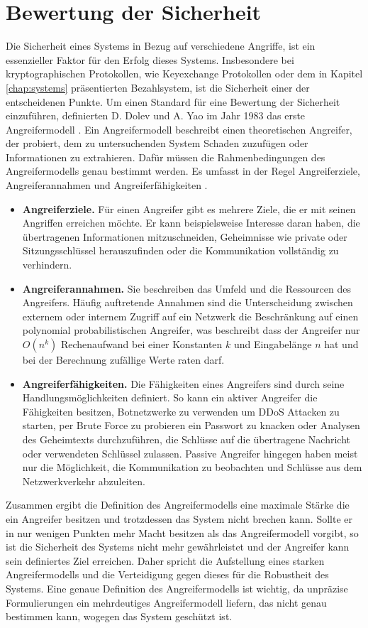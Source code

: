 \documentclass[
	fontsize=11pt,
	headings=small,
	parskip=half,           %
	bibliography=totoc,
	numbers=noenddot,       %
	open=any,               %
]{scrreprt}
\begin{document}
\section{Bewertung der Sicherheit}
\label{sec:auswertungSecurity}
Die Sicherheit eines Systems in Bezug auf verschiedene Angriffe, ist ein essenzieller Faktor für den Erfolg dieses Systems. Insbesondere bei kryptographischen Protokollen, wie Keyexchange Protokollen oder dem in Kapitel \ref{chap:systems} präsentierten Bezahlsystem, ist die Sicherheit einer der entscheidenen Punkte. Um einen Standard für eine Bewertung der Sicherheit einzuführen, definierten D. Dolev und A. Yao im Jahr 1983 das erste Angreifermodell \cite{am-dolev1983security}. Ein Angreifermodell beschreibt einen theoretischen Angreifer, der probiert, dem zu untersuchenden System Schaden zuzufügen oder Informationen zu extrahieren. Dafür müssen die Rahmenbedingungen des Angreifermodells genau bestimmt werden. Es umfasst in der Regel Angreiferziele, Angreiferannahmen und Angreiferfähigkeiten \cite{am-do2019role}. 
\begin{itemize}
    \item \textbf{Angreiferziele.} Für einen Angreifer gibt es mehrere Ziele, die er mit seinen Angriffen erreichen möchte. Er kann beispielsweise Interesse daran haben, die übertragenen Informationen mitzuschneiden, Geheimnisse wie private oder Sitzungsschlüssel herauszufinden oder die Kommunikation vollständig zu verhindern. 
    \item \textbf{Angreiferannahmen.} Sie beschreiben das Umfeld und die Ressourcen des Angreifers. Häufig auftretende Annahmen sind die Unterscheidung zwischen externem oder internem Zugriff auf ein Netzwerk die Beschränkung auf einen polynomial probabilistischen Angreifer, was beschreibt dass der Angreifer nur $O(n^k)$ Rechenaufwand bei einer Konstanten $k$ und Eingabelänge $n$ hat und bei der Berechnung zufällige Werte raten darf.
    \item \textbf{Angreiferfähigkeiten.} Die Fähigkeiten eines Angreifers sind durch seine Handlungsmöglichkeiten definiert. So kann ein aktiver Angreifer die Fähigkeiten besitzen, Botnetzwerke zu verwenden um DDoS Attacken zu starten, per Brute Force zu probieren ein Passwort zu knacken oder Analysen des Geheimtexts durchzuführen, die Schlüsse auf die übertragene Nachricht oder verwendeten Schlüssel zulassen. Passive Angreifer hingegen haben meist nur die Möglichkeit, die Kommunikation zu beobachten und Schlüsse aus dem Netzwerkverkehr abzuleiten.
\end{itemize} 
Zusammen ergibt die Definition des Angreifermodells eine maximale Stärke die ein Angreifer besitzen und trotzdessen das System nicht brechen kann. Sollte er in nur wenigen Punkten mehr Macht besitzen als das Angreifermodell vorgibt, so ist die Sicherheit des Systems nicht mehr gewährleistet und der Angreifer kann sein definiertes Ziel erreichen. Daher spricht die Aufstellung eines starken Angreifermodells und die Verteidigung gegen dieses für die Robustheit des Systems. Eine genaue Definition des Angreifermodells ist wichtig, da unpräzise Formulierungen ein mehrdeutiges Angreifermodell liefern, das nicht genau bestimmen kann, wogegen das System geschützt ist.
\end{document}
